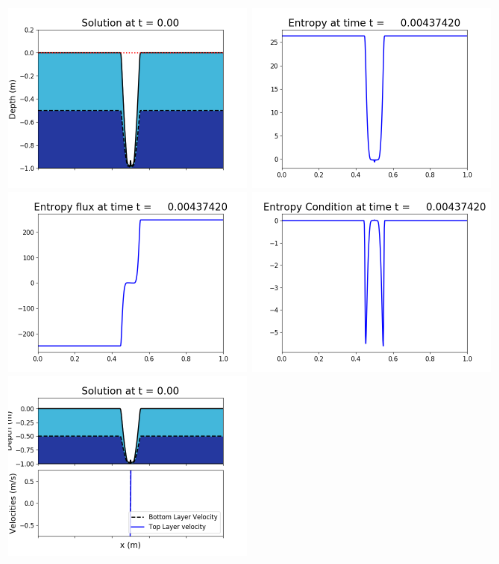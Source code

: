 \documentclass[11pt]{article}
\begin{document}
\includegraphics[width=0.475\textwidth]{frame0028fig1006.png}
\vskip 10pt 
\includegraphics[width=0.475\textwidth]{frame0028fig1007.png}
\includegraphics[width=0.475\textwidth]{frame0028fig1008.png}
\vskip 10pt 
\includegraphics[width=0.475\textwidth]{frame0028fig1009.png}
\vskip 10pt 
\includegraphics[width=0.475\textwidth]{frame0029fig1001.png}
\end{document}
